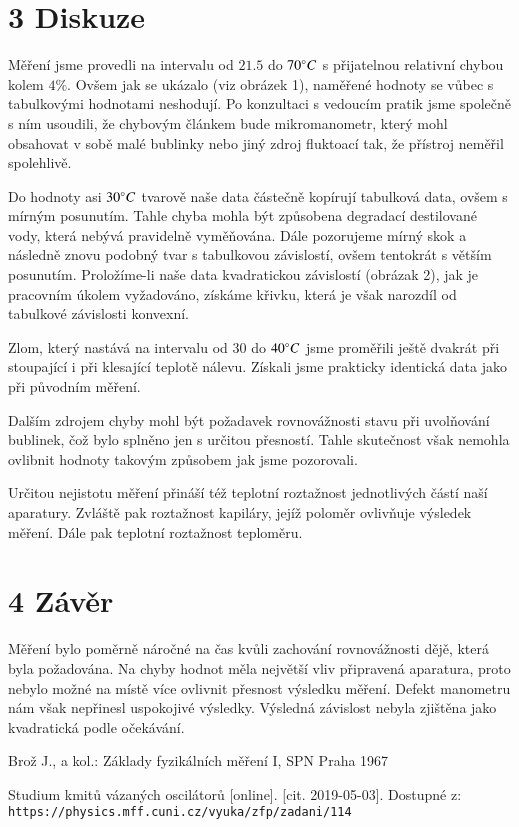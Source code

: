 \documentclass[a4paper]{article}
\begin{document}
\section*{3 Diskuze}
\par Měření jsme provedli na intervalu od $21.5$ do $70 \degree C$ s přijatelnou relativní chybou kolem $4\%$. Ovšem jak se ukázalo (viz obrázek 1), naměřené hodnoty se vůbec s tabulkovými hodnotami neshodují. Po konzultaci s vedoucím pratik jsme společně s ním usoudili, že chybovým článkem bude mikromanometr, který mohl obsahovat v sobě malé bublinky nebo jiný zdroj fluktoací tak, že přístroj neměřil spolehlivě. 
\par Do hodnoty asi $30 \degree C$ tvarově naše data částečně kopírují tabulková data, ovšem s mírným posunutím. Tahle chyba mohla být způsobena degradací destilované vody, která nebývá pravidelně vyměňována. Dále pozorujeme mírný skok a následně znovu podobný tvar s tabulkovou závislostí, ovšem tentokrát s větším posunutím. 
Proložíme-li naše data kvadratickou závislostí (obrázak 2), jak je pracovním úkolem vyžadováno, získáme křivku, která je však narozdíl od tabulkové závislosti konvexní.
\par Zlom, který nastává na intervalu od $30$ do $40 \degree C$ jsme proměřili ještě dvakrát při stoupající i při klesající teplotě nálevu. Získali jsme prakticky identická data jako při původním měření. 
\par Dalším zdrojem chyby mohl být požadavek rovnovážnosti stavu při uvolňování bublinek, čož bylo splněno jen s určitou přesností. Tahle skutečnost však nemohla ovlibnit hodnoty takovým způsobem jak jsme pozorovali. 
\par Určitou nejistotu měření přináší též teplotní roztažnost jednotlivých částí naší aparatury. Zvláště pak roztažnost kapiláry, jejíž poloměr ovlivňuje výsledek měření. Dále pak teplotní roztažnost teploměru. 

\section*{4 Závěr}
\par Měření bylo poměrně náročné na čas kvůli zachování rovnovážnosti dějě, která byla požadována. Na chyby hodnot měla největší vliv připravená aparatura, proto nebylo možné na místě více ovlivnit přesnost výsledku měření. Defekt manometru nám však nepřinesl uspokojivé výsledky. Výsledná závislost nebyla zjištěna jako kvadratická podle očekávání.

\renewcommand\refname{Použitá literatura}
\begin{thebibliography}{}

Brož J., a kol.: Základy fyzikálních měření I, SPN Praha 1967 
 
Studium kmitů vázaných oscilátorů [online]. [cit. 2019-05-03]. Dostupné z: 
\\\texttt{https://physics.mff.cuni.cz/vyuka/zfp/zadani/114}
\end{thebibliography}
\end{document}

